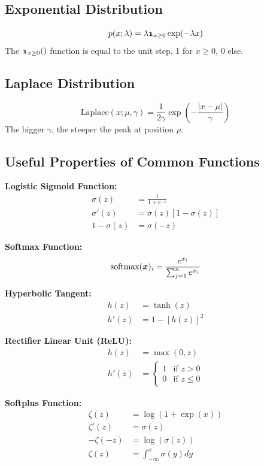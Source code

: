 \begin{multicols}{2}
	\subsection{Exponential Distribution}
	\[ p(x;\lambda) = \lambda \bol{1}_{x\ge 0} \exp(-\lambda x) \]
	The $\bol{1}_{x\ge 0}()$ function is equal to the unit step, 1 for $x\ge 0$, 0 else.

	\subsection{Laplace Distribution}
	\[ \text{Laplace}(x;\mu,\gamma)=\frac{1}{2\gamma}\exp\left( -\frac{\lvert x-\mu \rvert }{\gamma} \right) \]
	The bigger $\gamma$, the steeper the peak at position $\mu$.

	\subsection{Useful Properties of Common Functions}
	\textbf{Logistic Sigmoid Function:}
	\begin{align*}
	\sigma(z) &= \frac{1}{1+e^{-z}}\\
	\sigma'(z)&= \sigma(z)\left[ 1-\sigma(z) \right]\\
	1-\sigma(z) &= \sigma(-z)
	\end{align*}

	\textbf{Softmax Function:}
	\begin{align*}
	\text{softmax}(\bol{x})_i = \frac{e^{x_i}}{\sum_{j=1}^{n}e^{x_j}}
	\end{align*}

	\textbf{Hyperbolic Tangent:}
	\begin{align*}
	h(z) &= \tanh(z)\\
	h'(z)&= 1-\left[h(z)\right]^2
	\end{align*}

	\textbf{Rectifier Linear Unit (ReLU):}
	\begin{align*}
	h(z) &= \max\left(0,z\right)\\
	h'(z)&= \begin{cases}
	1 & \text{if } z>0\\
	0 & \text{if } z\le 0
	\end{cases}
	\end{align*}

	\textbf{Softplus Function:}
	\begin{align*}
	\zeta(z) &= \log\left(1+\exp(x)\right)\\
	\zeta'(z)&= \sigma(z)\\
	-\zeta(-z) &= \log\left(\sigma(z)\right)\\
	\zeta(z) &= \int_{-\infty}^{x}\sigma(y)dy
	\end{align*}


\end{multicols}
